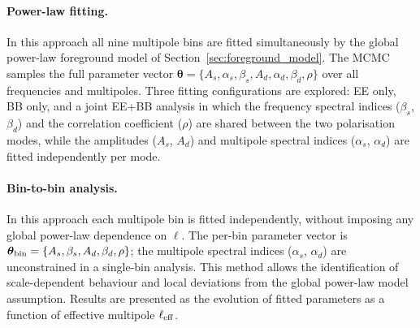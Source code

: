\paragraph{Power-law fitting.}
In this approach all nine multipole bins are fitted simultaneously by the global power-law foreground model of Section~\ref{sec:foreground_model}. The MCMC samples the full parameter vector $\boldsymbol{\theta} = \{A_s, \alpha_s, \beta_s, A_d, \alpha_d, \beta_d, \rho\}$ over all frequencies and multipoles. Three fitting configurations are explored: EE only, BB only, and a joint EE+BB analysis in which the frequency spectral indices ($\beta_s$, $\beta_d$) and the correlation coefficient ($\rho$) are shared between the two polarisation modes, while the amplitudes ($A_s$, $A_d$) and multipole spectral indices ($\alpha_s$, $\alpha_d$) are fitted independently per mode.

\paragraph{Bin-to-bin analysis.}
In this approach each multipole bin is fitted independently, without imposing any global power-law dependence on $\ell$. The per-bin parameter vector is $\boldsymbol{\theta}_{\rm bin} = \{A_s, \beta_s, A_d, \beta_d, \rho\}$; the multipole spectral indices ($\alpha_s$, $\alpha_d$) are unconstrained in a single-bin analysis. This method allows the identification of scale-dependent behaviour and local deviations from the global power-law model assumption. Results are presented as the evolution of fitted parameters as a function of effective multipole $\ell_{\rm eff}$.


